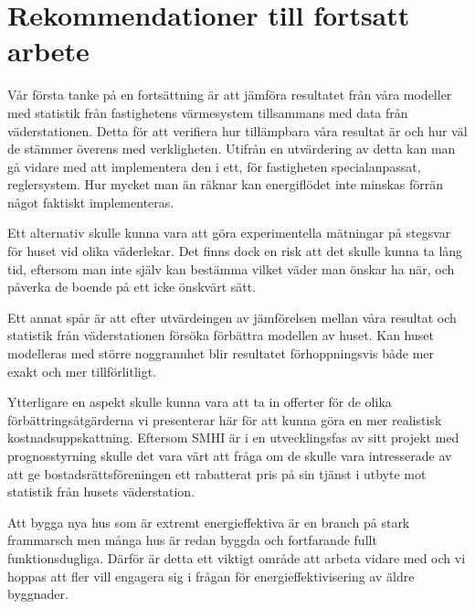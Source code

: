 \section{Rekommendationer till fortsatt arbete}

Vår första tanke på en fortsättning är att jämföra resultatet från våra modeller med 
statistik från fastighetens värmesystem tillsammans med data från väderstationen. Detta för att verifiera hur tillämpbara 
våra resultat är och hur väl de stämmer överens med verkligheten. Utifrån en utvärdering
 av detta kan man gå vidare med att implementera den i ett, för fastigheten 
 specialanpassat, reglersystem. Hur mycket man än räknar kan energiflödet inte minskas 
 förrän något faktiskt implementeras.

Ett alternativ skulle kunna vara att göra experimentella mätningar på stegsvar för huset
 vid olika väderlekar. Det finns dock en risk att det skulle kunna ta lång tid, eftersom man 
 inte själv kan bestämma vilket väder man önskar ha när, och påverka de boende på ett 
 icke önskvärt sätt.

Ett annat spår är att efter utvärdeingen av jämförelsen mellan våra resultat och statistik 
från väderstationen försöka förbättra modellen av huset. Kan huset modelleras med 
större noggrannhet blir resultatet förhoppningsvis både mer exakt och mer tillförlitligt. %

Ytterligare en aspekt skulle kunna vara att ta in offerter för de olika förbättringsåtgärderna vi presenterar här för att kunna göra en mer realistisk kostnadsuppskattning. Eftersom 
SMHI är i en utvecklingsfas av sitt projekt med prognosstyrning skulle det vara värt att
 fråga om de skulle vara intresserade av att ge bostadsrättsföreningen ett rabatterat pris 
 på sin tjänst i utbyte mot statistik från husets väderstation.

Att bygga nya hus som är extremt energieffektiva är en branch på stark frammarsch men
 många hus är redan byggda och fortfarande fullt funktionsdugliga. Därför är detta ett 
viktigt område att arbeta vidare med och vi hoppas att fler vill engagera sig i frågan för 
energieffektivisering av äldre byggnader.

